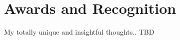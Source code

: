 \pagestyle{plain}
\chapter[Awards and Recognition][Awards and Recognition]{Awards and Recognition}

My totally unique and insightful thoughts.. TBD